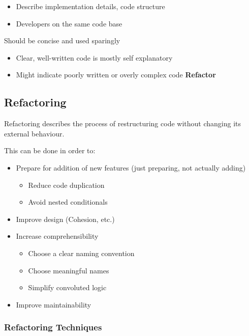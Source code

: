 \documentclass[
../../Software_Engineering_Summary.tex,
]
{subfiles}
\begin{document}
\begin{defbox}
    \begin{itemize}
        \item {} Describe implementation details, code structure
        \item {} Developers on the same code base
    \end{itemize}

    Should be concise and used sparingly
    \begin{itemize}
        \item Clear, well-written code is mostly self explanatory
        \item Might indicate poorly written or overly complex code \rightarrow \textbf{Refactor}
    \end{itemize}
\end{defbox}

\subsection{Refactoring}
Refactoring describes the process of 
restructuring code without changing its external behaviour.

This can be done in order to:
\begin{itemize}
    \item Prepare for addition of new features (just preparing, not actually adding)
    \begin{itemize}
        \item Reduce code duplication
        \item Avoid nested conditionals
    \end{itemize}
    \item Improve design (Cohesion, etc.)
    \item Increase comprehensibility
    \begin{itemize}
        \item Choose a clear naming convention
        \item Choose meaningful names
        \item Simplify convoluted logic
    \end{itemize}
    \item Improve maintainability
\end{itemize}

\subsubsection{Refactoring Techniques}
\end{document}
